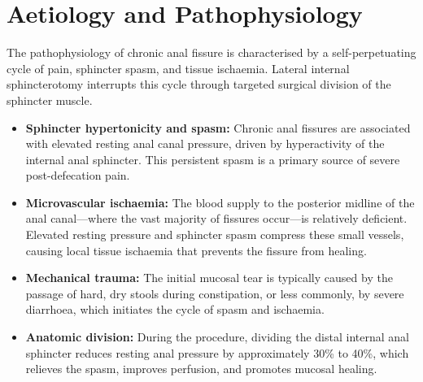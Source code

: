 \section*{Aetiology and Pathophysiology}
The pathophysiology of chronic anal fissure is characterised by a self-perpetuating cycle of pain, sphincter spasm, and tissue ischaemia. Lateral internal sphincterotomy interrupts this cycle through targeted surgical division of the sphincter muscle.
\begin{itemize}
    \item \textbf{Sphincter hypertonicity and spasm:} Chronic anal fissures are associated with elevated resting anal canal pressure, driven by hyperactivity of the internal anal sphincter. This persistent spasm is a primary source of severe post-defecation pain.
    \item \textbf{Microvascular ischaemia:} The blood supply to the posterior midline of the anal canal—where the vast majority of fissures occur—is relatively deficient. Elevated resting pressure and sphincter spasm compress these small vessels, causing local tissue ischaemia that prevents the fissure from healing.
    \item \textbf{Mechanical trauma:} The initial mucosal tear is typically caused by the passage of hard, dry stools during constipation, or less commonly, by severe diarrhoea, which initiates the cycle of spasm and ischaemia.
    \item \textbf{Anatomic division:} During the procedure, dividing the distal internal anal sphincter reduces resting anal pressure by approximately 30\% to 40\%, which relieves the spasm, improves perfusion, and promotes mucosal healing.
\end{itemize}

